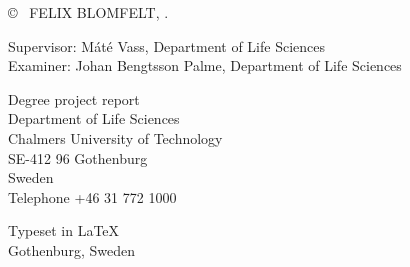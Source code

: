 \copyright ~ FELIX BLOMFELT, \the\year. \setlength{\parskip}{1cm}

Supervisor: Máté Vass, Department of Life Sciences\\
Examiner: Johan Bengtsson Palme, Department of Life Sciences \setlength{\parskip}{1cm}

Degree project report \the\year\\	
Department of Life Sciences\\
Chalmers University of Technology\\
SE-412 96 Gothenburg\\
Sweden\\
Telephone +46 31 772 1000 \setlength{\parskip}{0.5cm}

\vfill

Typeset in \LaTeX \tagtemp\\
Gothenburg, Sweden \the\year
